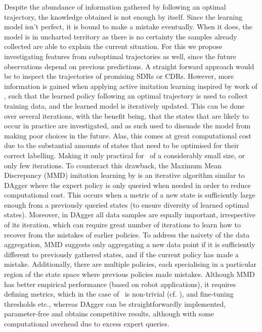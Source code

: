 \documentclass[twocolumn]{svjour3}
\begin{document}
Despite the abundance of information gathered by following an optimal 
trajectory, the knowledge obtained is not enough by itself. Since the learning 
model isn't perfect, it is bound to make a mistake eventually. When it does, 
the model is in uncharted territory as there is no certainty the samples 
already collected are able to explain the current situation. For this we 
propose investigating features from suboptimal trajectories as well, since the 
future observations depend on previous predictions. 
A straight forward approach would be to inspect the trajectories of promising 
SDRs or CDRs. However, more information is gained when applying active 
imitation learning inspired by work of \cite{RossB10,RossGB11}, such that the 
learned policy following an optimal trajectory is used to collect training 
data, and the learned model is iteratively updated. 
This can be done over several iterations, with the benefit being, that the 
states that are likely to occur in practice are investigated, and as such used 
to dissuade the model from making poor choices in the future. 
Alas, this comes at great computational cost due to the substantial amounts of 
states that need to be optimised for their correct labelling. Making it only 
practical for \jsp\ of a considerably small size, or only few iterations.
To counteract this drawback, the Maximum Mean Discrepancy (MMD) imitation 
learning by \cite{Kim13} is an iterative algorithm similar to DAgger where the 
expert policy is only queried when needed in order to reduce computational cost. 
This occurs when a metric of a new state is sufficiently large enough from a 
previously queried states (to ensure diversity of learned optimal states). 
Moreover, in DAgger all data samples are equally important, irrespective of its 
iteration, which can require great number of iterations to learn how to recover 
from the mistakes of earlier policies. To address the naivety of the data 
aggregation, MMD suggests only aggregating a new data point 
if it is sufficiently different to previously gathered states, and if 
the current policy has made a mistake. 
Additionally, there are multiple policies, each specialising in a particular 
region of the state space where previous policies made mistakes.
Although MMD has better empirical performance (based on robot applications), it 
requires defining metrics, which in the case of \jsp\ is non-trivial (cf. 
\cite{InRu12}), and fine-tuning thresholds etc., whereas DAgger can be 
straightforwardly implemented, parameter-free and obtains competitive results, 
although with some computational overhead due to excess expert queries. 
\end{document}
